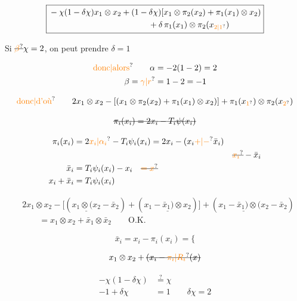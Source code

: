 \[
\boxed{\begin{aligned}
&-\chi(1-\delta\chi)x_1\otimes x_2+(1-\delta\chi)[x_1\otimes\pi_2(x_2)+\pi_1(x_1)\otimes x_2)\\
&\hspace{12em}+\delta\,\pi_1(x_1)\otimes\pi_2(x_{\unsure{2|1}})
\end{aligned}}
\]

Si $\deleted{\unsure{\beta}}\chi=2$, on peut prendre $\delta=1$

\[
\begin{aligned}
\text{\unsure{donc|alors}}\qquad\alpha&=-2(1-2)=2\\
\beta=\unsure{\gamma|r}&=1-2=-1
\end{aligned}
\]

\[
\text{\unsure{donc|d'où}}\qquad
2x_1\otimes x_2-[(x_1\otimes\pi_2(x_2)+\pi_1(x_1)\otimes x_2)]
+\pi_1(x_{\unsure{1}})\otimes\pi_2(x_{\unsure{2}})
\]

\[\deleted{\pi_i(x_i)=2x_i-T_i\psi(x_i)}\]

\[
\begin{aligned}
\pi_i(x_i)&=2\unsure{x_i|\alpha_i}-T_i\psi_i(x_i)=2x_i-(x_i\unsure{+|-}\bar x_i)\\
&&{}\deleted{\unsure{x_i}}-\bar x_i\\
\bar x_i&=T_i\psi_i(x_i)-x_i\quad\deleted{\unsure{=x}}\\
x_i+\bar x_i&=T_i\psi_i(x_i)
\end{aligned}
\]

\[
\begin{aligned}
&2x_1\otimes x_2-\big[(\underline{x_1\otimes(x_2}-\bar x_2)+(\underline{x_1-\bar x_1)\otimes x_2})\big]
+(\underline{x_1-\bar x_1)\otimes(x_2}-\bar x_2)\\
&\qquad=x_1\otimes x_2+\bar x_1\otimes\bar x_2\qquad\text{O.K.}
\end{aligned}
\]

\[\bar x_i=x_i-\pi_i(x_i)=\big\{\]

\[x_1\otimes x_2+\deleted{(x_i-\unsure{\pi_i|R_i}(x)}\]

\[
\begin{aligned}
-\chi(1-\delta\chi)&\overset{?}{=}\chi\\
-1+\delta\chi&=1\qquad\boxed{\delta\chi=2}
\end{aligned}
\]

